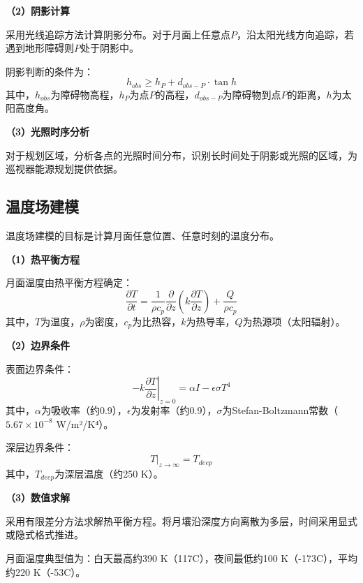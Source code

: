 \textbf{（2）阴影计算}

采用光线追踪方法计算阴影分布。对于月面上任意点$P$，沿太阳光线方向追踪，若遇到地形障碍则$P$处于阴影中。

阴影判断的条件为：
\begin{equation}
    h_{obs} \geq h_P + d_{obs-P} \cdot \tan h
    \label{eq:shadow}
\end{equation}
其中，$h_{obs}$为障碍物高程，$h_P$为点$P$的高程，$d_{obs-P}$为障碍物到点$P$的距离，$h$为太阳高度角。

\textbf{（3）光照时序分析}

对于规划区域，分析各点的光照时间分布，识别长时间处于阴影或光照的区域，为巡视器能源规划提供依据。

\subsection{温度场建模}
\label{subsec:temperature}

温度场建模的目标是计算月面任意位置、任意时刻的温度分布。

\textbf{（1）热平衡方程}

月面温度由热平衡方程确定：
\begin{equation}
    \frac{\partial T}{\partial t} = \frac{1}{\rho c_p}\frac{\partial}{\partial z}\left(k\frac{\partial T}{\partial z}\right) + \frac{Q}{\rho c_p}
    \label{eq:heat_eq}
\end{equation}
其中，$T$为温度，$\rho$为密度，$c_p$为比热容，$k$为热导率，$Q$为热源项（太阳辐射）。

\textbf{（2）边界条件}

表面边界条件：
\begin{equation}
    -k\left.\frac{\partial T}{\partial z}\right|_{z=0} = \alpha I - \epsilon\sigma T^4
    \label{eq:surface_bc}
\end{equation}
其中，$\alpha$为吸收率（约0.9），$\epsilon$为发射率（约0.9），$\sigma$为Stefan-Boltzmann常数（$5.67\times 10^{-8}$ W/m²/K⁴）。

深层边界条件：
\begin{equation}
    T|_{z\to\infty} = T_{deep}
    \label{eq:deep_bc}
\end{equation}
其中，$T_{deep}$为深层温度（约250 K）。

\textbf{（3）数值求解}

采用有限差分方法求解热平衡方程。将月壤沿深度方向离散为多层，时间采用显式或隐式格式推进。

月面温度典型值为：白天最高约390 K（117\degree C），夜间最低约100 K（-173\degree C），平均约220 K（-53\degree C）。
